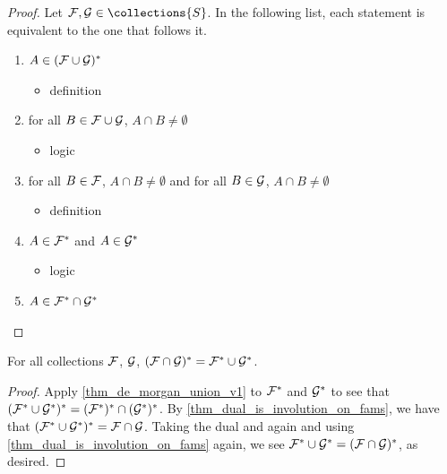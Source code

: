 \begin{proof}
Let $\family, \familytwo \in \collections{S}$. In the following list, each statement is equivalent to the one that follows it.
    \begin{enumerate}
        \item $A \in (\mathcal{F} \cup \mathcal{G})^*$
        \begin{itemize}
            \item[--] definition
        \end{itemize}

        \item for all $B \in \mathcal{F} \cup \mathcal{G}$, $A \cap B \neq \emptyset$
        \begin{itemize}
            \item[--] logic
        \end{itemize}

        \item for all $B \in \mathcal{F}$, $A \cap B \neq \emptyset$ and for all $B \in \mathcal{G}$, $A \cap B \neq \emptyset$
        \begin{itemize}
            \item[--] definition
        \end{itemize}

        \item $A \in \mathcal{F}^*$ and $A \in \mathcal{G}^*$
        \begin{itemize}
            \item[--] logic
        \end{itemize}

        \item $A \in \mathcal{F}^* \cap \mathcal{G}^*$
    \end{enumerate}
\end{proof}

\begin{theorem}
    \label{thm_de_morgan_union_v2}
    \leanok{}
    For all collections $\mathcal{F}$, $\mathcal{G}$, $(\mathcal{F} \cap \mathcal{G})^* = \mathcal{F}^* \cup \mathcal{G}^*$.
\end{theorem}

\begin{proof}
    Apply \cref{thm_de_morgan_union_v1} to $\mathcal{F}^*$ and $\mathcal{G}^*$ to see that $(\mathcal{F}^* \cup \mathcal{G}^*)^* = (\mathcal{F}^*)^* \cap (\mathcal{G}^*)^*$.  By \cref{thm_dual_is_involution_on_fams}, we have that $(\mathcal{F}^* \cup \mathcal{G}^*)^* = \mathcal{F} \cap \mathcal{G}$.  Taking the dual and again and using \cref{thm_dual_is_involution_on_fams} again, we see $\mathcal{F}^* \cup \mathcal{G}^* = (\mathcal{F} \cap \mathcal{G})^*$, as desired.
\end{proof}

